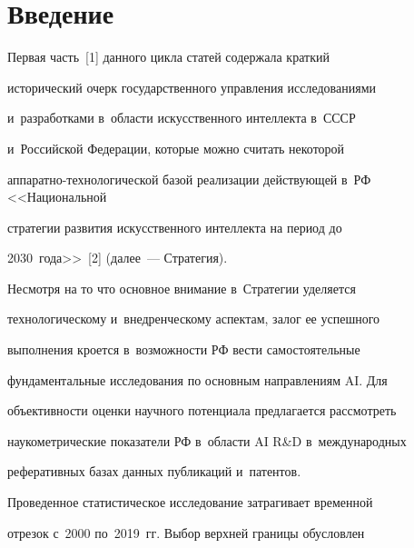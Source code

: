 




 \thispagestyle{headings}


 


 \vspace*{-12pt}





\section{Введение}


 


 Первая часть~[1] данного цикла статей содержала краткий 


исторический очерк государственного управления исследованиями 


и~разработками в~области искусственного интеллекта в~СССР 


и~Российской Федерации, которые можно считать некоторой 


аппаратно-технологической базой реализации действующей в~РФ <<Национальной 


стратегии развития искусственного интеллекта на период до 


2030~года>>~[2] (далее~--- Стратегия).


 


 Несмотря на то что основное внимание в~Стратегии уделяется 


технологическому и~внедренческому аспектам, залог ее успешного 


выполнения кроется в~возможности РФ вести самостоятельные 


фундаментальные исследования по основным направлениям AI. Для 


объективности оценки научного потенциала предлагается рассмотреть 


наукометрические показатели РФ в~области AI R\&D в~международных 


реферативных базах данных публикаций и~патентов.


 


 Проведенное статистическое исследование затрагивает временной 


отрезок с~2000 по~2019~гг. Выбор верхней границы обусловлен 


